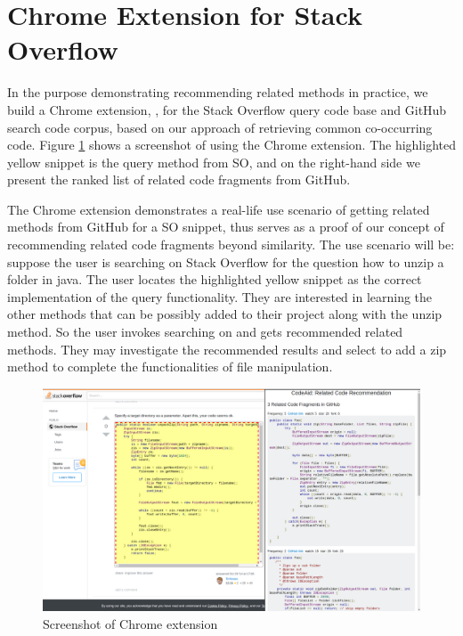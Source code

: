 \section{Chrome Extension for Stack Overflow}
\label{sec:chrome}

In the purpose demonstrating recommending related methods in practice, we build a Chrome extension, {\tool}, for the Stack Overflow query code base and GitHub search code corpus, based on our approach of retrieving common co-occurring code. Figure \ref{fig:chrome} shows a screenshot of using the Chrome extension. The highlighted yellow snippet is the query method from SO, and on the right-hand side we present the ranked list of related code fragments from GitHub. 

The Chrome extension demonstrates a real-life use scenario of getting related methods from GitHub for a SO snippet, thus serves as a proof of our concept of recommending related code fragments beyond similarity.
The use scenario will be: suppose the user is searching on Stack Overflow for the question {\ttt how to unzip a folder in java}. The user locates the highlighted yellow snippet as the correct implementation of the query functionality. They are interested in learning the other methods that can be possibly added to their project along with the {\ttt unzip} method. So the user invokes searching on {\tool} and gets recommended related methods. They may investigate the recommended results and select to add a {\ttt zip} method to complete the functionalities of file manipulation. 

\begin{figure}[!h]
	\includegraphics[width=\linewidth]{figures/ui.png}
	\caption{Screenshot of Chrome extension}
	\label{fig:chrome}
\end{figure}

